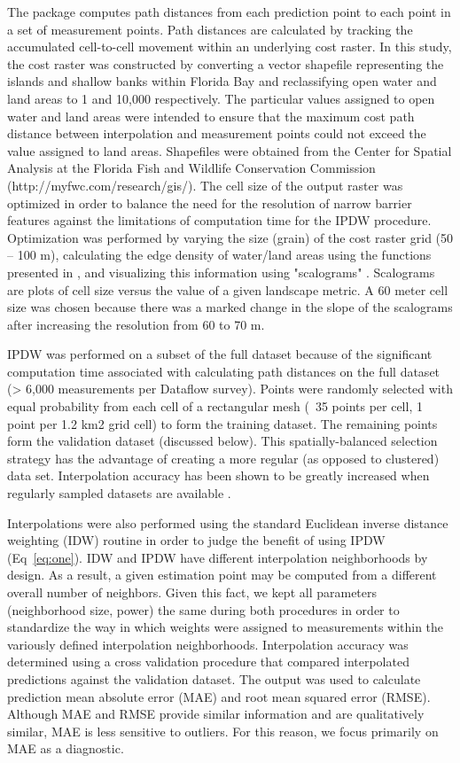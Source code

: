 \documentclass[shortnames,nofooter,noheadings]{jss}
\begin{document}
  The  package computes path distances from each prediction point to each point in a set of measurement points. Path distances are calculated by tracking the accumulated cell-to-cell movement within an underlying cost raster. In this study, the cost raster was constructed by converting a vector shapefile representing the islands and shallow banks within Florida Bay and reclassifying open water and land areas to 1 and 10,000 respectively. The particular values assigned to open water and land areas were intended to ensure that the maximum cost path distance between interpolation and measurement points could not exceed the value assigned to land areas. Shapefiles were obtained from the Center for Spatial Analysis at the Florida Fish and Wildlife Conservation Commission (http://myfwc.com/research/gis/).  The cell size of the output raster was optimized in order to balance the need for the resolution of narrow barrier features against the limitations of computation time for the IPDW procedure. Optimization was performed by varying the size (grain) of the cost raster grid (50 – 100 m), calculating the edge density of water/land areas using the functions presented in \citet{vanderwal}, and visualizing this information using "scalograms" \citep{rutchey2009determining}. Scalograms are plots of cell size versus the value of a given landscape metric. A 60 meter cell size was chosen because there was a marked change in the slope of the scalograms after increasing the resolution from 60 to 70 m. 

  IPDW was performed on a subset of the full dataset because of the significant computation time associated with calculating path distances on the full dataset (> 6,000 measurements per Dataflow survey). Points were randomly selected with equal probability from each cell of a rectangular mesh (~35 points per cell, 1 point per 1.2 km2 grid cell) to form the training dataset. The remaining points form the validation dataset (discussed below). This spatially-balanced selection strategy has the advantage of creating a more regular (as opposed to clustered) data set. Interpolation accuracy has been shown to be greatly increased when regularly sampled datasets are available \citep{isaaks1989applied, zimmerman1999experimental}.  

  Interpolations were also performed using the standard Euclidean inverse distance weighting (IDW) routine in order to judge the benefit of using IPDW (Eq~\ref{eq:one}). IDW and IPDW have different interpolation neighborhoods by design. As a result, a given estimation point may be computed from a different overall number of neighbors. Given this fact, we kept all parameters (neighborhood size, power) the same during both procedures in order to standardize the way in which weights were assigned to measurements within the variously defined interpolation neighborhoods. Interpolation accuracy was determined using a cross validation procedure that compared interpolated predictions against the validation dataset. The output was used to calculate prediction mean absolute error (MAE) and root mean squared error (RMSE). Although MAE and RMSE provide similar information and are qualitatively similar, MAE is less sensitive to outliers. For this reason, we focus primarily on MAE as a diagnostic.
\end{document}
